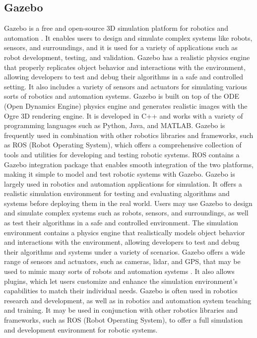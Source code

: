 \documentclass[12pt,oneside]{article}
\begin{document}
\subsection{Gazebo}
Gazebo is a free and open-source 3D simulation platform for robotics and automation \cite{38_abbyasov2020automatic}. It enables users to design and simulate complex systems like robots, sensors, and surroundings, and it is used for a variety of applications such as robot development, testing, and validation. Gazebo has a realistic physics engine that properly replicates object behavior and interactions with the environment, allowing developers to test and debug their algorithms in a safe and controlled setting. It also includes a variety of sensors and actuators for simulating various sorts of robotics and automation systems. Gazebo is built on top of the ODE (Open Dynamics Engine) physics engine and generates realistic images with the Ogre 3D rendering engine. It is developed in C++ and works with a variety of programming languages such as Python, Java, and MATLAB. 
Gazebo is frequently used in combination with other robotics libraries and frameworks, such as ROS (Robot Operating System), which offers a comprehensive collection of tools and utilities for developing and testing robotic systems. ROS contains a Gazebo integration package that enables smooth integration of the two platforms, making it simple to model and test robotic systems with Gazebo. Gazebo is largely used in robotics and automation applications for simulation. It offers a realistic simulation environment for testing and evaluating algorithms and systems before deploying them in the real world. Users may use Gazebo to design and simulate complex systems such as robots, sensors, and surroundings, as well as test their algorithms in a safe and controlled environment. The simulation environment contains a physics engine that realistically models object behavior and interactions with the environment, allowing developers to test and debug their algorithms and systems under a variety of scenarios. Gazebo offers a wide range of sensors and actuators, such as cameras, lidar, and GPS, that may be used to mimic many sorts of robots and automation systems \cite{39_echeverria2011modular}. It also allows plugins, which let users customize and enhance the simulation environment's capabilities to match their individual needs. Gazebo is often used in robotics research and development, as well as in robotics and automation system teaching and training. It may be used in conjunction with other robotics libraries and frameworks, such as ROS (Robot Operating System), to offer a full simulation and development environment for robotic systems.
\end{document}
